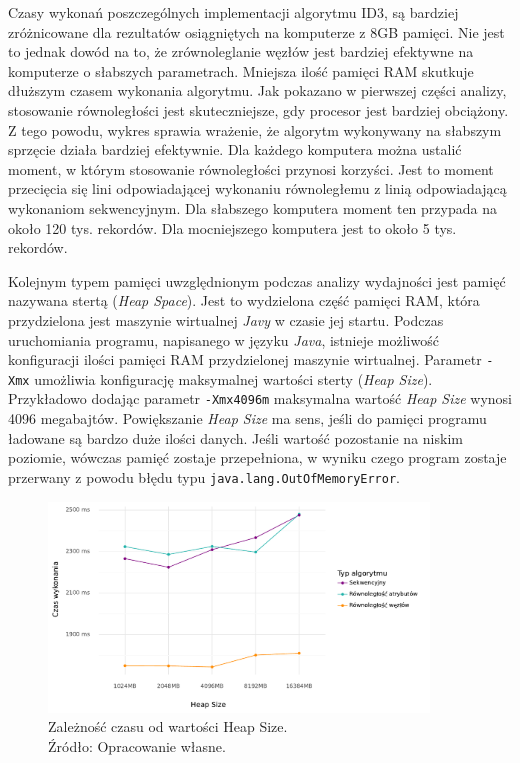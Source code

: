 \documentclass[12pt]{article}
\begin{document}
Czasy wykonań poszczególnych implementacji algorytmu ID3, są bardziej zróżnicowane dla rezultatów
osiągniętych na komputerze z 8GB pamięci.
Nie jest to jednak dowód na to, że zrównoleglanie węzłów jest bardziej efektywne
na komputerze o słabszych parametrach. Mniejsza ilość pamięci RAM skutkuje dłuższym
czasem wykonania algorytmu. Jak pokazano w pierwszej części analizy, stosowanie równoległości jest skuteczniejsze,
gdy procesor jest bardziej obciążony. Z tego powodu, wykres sprawia wrażenie, że algorytm wykonywany na słabszym
sprzęcie działa bardziej efektywnie.
Dla każdego komputera można ustalić moment, w którym stosowanie równoległości przynosi korzyści. Jest to moment
przecięcia się lini odpowiadającej wykonaniu równoległemu z linią odpowiadającą wykonaniom sekwencyjnym.
Dla słabszego komputera moment ten przypada na około 120 tys. rekordów. Dla mocniejszego komputera
jest to około 5 tys. rekordów.

Kolejnym typem pamięci uwzględnionym podczas analizy wydajności jest pamięć nazywana stertą (\textit{Heap Space}). Jest to wydzielona
część pamięci RAM, która przydzielona jest maszynie wirtualnej \textit{Javy} w czasie jej startu.
Podczas uruchomiania programu, napisanego w języku \textit{Java}, istnieje możliwość konfiguracji ilości
pamięci RAM przydzielonej maszynie wirtualnej. Parametr \verb|-Xmx| umożliwia konfigurację maksymalnej
wartości sterty (\textit{Heap Size}). Przykładowo dodając parametr \verb|-Xmx4096m|
maksymalna wartość \textit{Heap Size} wynosi 4096 megabajtów. Powiększanie \textit{Heap Size} ma sens, jeśli do pamięci programu
ładowane są bardzo duże ilości danych. Jeśli wartość pozostanie na niskim poziomie, wówczas pamięć zostaje przepełniona, w wyniku czego
program zostaje przerwany z powodu błędu typu \verb|java.lang.OutOfMemoryError|.

\begin{figure}[H]
    \centering
	\includegraphics[width=0.9\textwidth]{analysis-heap-size.pdf}
    \caption{Zależność czasu od wartości Heap Size.\\Źródło: Opracowanie własne.}
    \label{fig:analysis-heap-size}
\end{figure}
\end{document}
